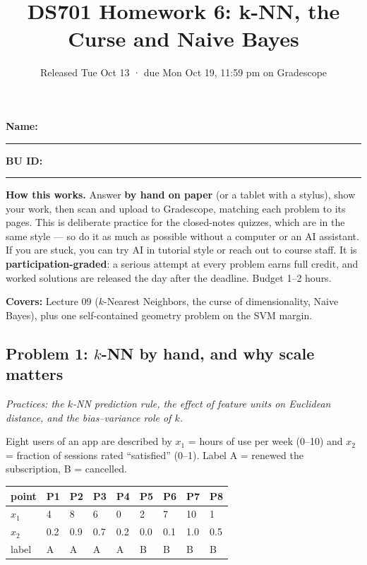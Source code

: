 \documentclass[
  11pt,
]{article}
\title{DS701 Homework 6: k-NN, the Curse and Naive Bayes}
\subtitle{Released Tue Oct 13 · due Mon Oct 19, 11:59 pm on Gradescope}
\author{}
\date{}
\newcounter{none} %
\begin{document}
\maketitle


\noindent\textbf{Name:}\ \rule{2.0in}{0.4pt}\qquad\textbf{BU ID:}\ \rule{1.2in}{0.4pt}
\vspace{6pt}

\textbf{How this works.} Answer \textbf{by hand on paper} (or a tablet
with a stylus), show your work, then scan and upload to Gradescope,
matching each problem to its pages. This is deliberate practice for the
closed-notes quizzes, which are in the same style --- so do it as much
as possible without a computer or an AI assistant. If you are stuck, you
can try AI in tutorial style or reach out to course staff. It is
\textbf{participation-graded}: a serious attempt at every problem earns
full credit, and worked solutions are released the day after the
deadline. Budget 1--2 hours.

\textbf{Covers:} Lecture 09 (\(k\)-Nearest Neighbors, the curse of
dimensionality, Naive Bayes), plus one self-contained geometry problem
on the SVM margin.

\subsection{\texorpdfstring{Problem 1: \(k\)-NN by hand, and why scale
matters}{Problem 1: k-NN by hand, and why scale matters}}\label{problem-1-k-nn-by-hand-and-why-scale-matters}

\emph{Practices: the \(k\)-NN prediction rule, the effect of feature
units on Euclidean distance, and the bias--variance role of \(k\).}

Eight users of an app are described by \(x_1\) = hours of use per week
(0--10) and \(x_2\) = fraction of sessions rated ``satisfied'' (0--1).
Label A = renewed the subscription, B = cancelled.

{\def\LTcaptype{none} %
\begin{longtable}[]{@{}lllllllll@{}}
\toprule\noalign{}
point & P1 & P2 & P3 & P4 & P5 & P6 & P7 & P8 \\
\midrule\noalign{}
\endhead
\bottomrule\noalign{}
\endlastfoot
\(x_1\) & 4 & 8 & 6 & 0 & 2 & 7 & 10 & 1 \\
\(x_2\) & 0.2 & 0.9 & 0.7 & 0.2 & 0.0 & 0.1 & 1.0 & 0.5 \\
label & A & A & A & A & B & B & B & B \\
\end{longtable}
}
\end{document}

